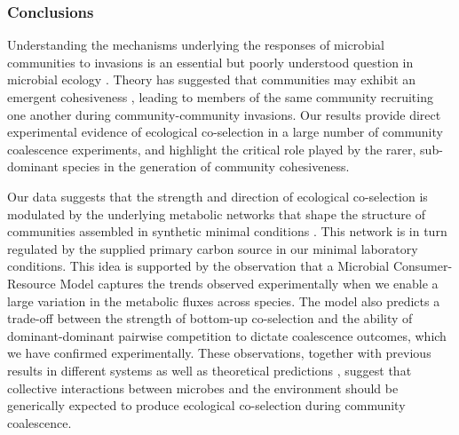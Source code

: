 \documentclass[a4paper,10pt]{article}
\begin{document}
\subsubsection*{Conclusions}

Understanding the mechanisms underlying the responses of microbial communities to invasions is
an essential but poorly understood question in microbial ecology \cite{Rillig2015}.
Theory has suggested that communities may exhibit an emergent cohesiveness
\cite{Gilpin1994,Livingston2013,Tikhonov2016,Tikhonov2017},
leading to members of the same community recruiting one another during
community-community invasions.
Our results provide direct experimental evidence of ecological co-selection in a large number
of community coalescence experiments,
and highlight the critical role played by the rarer, sub-dominant species in the generation
of community cohesiveness.

Our data suggests that the strength and direction of ecological co-selection is modulated
by the underlying metabolic networks that shape the structure of
communities assembled in synthetic minimal conditions
\cite{Goldford2018,Estrela2020}.
This network is in turn regulated by the supplied primary carbon source
in our minimal laboratory conditions.
This idea is supported by the observation that a Microbial Consumer-Resource Model
captures the trends observed experimentally when we enable a large variation
in the metabolic fluxes across species.
The model also predicts a trade-off between the strength of bottom-up co-selection
and the ability of dominant-dominant pairwise competition to dictate coalescence outcomes,
which we have confirmed experimentally.
These observations,
together with previous results in different systems \cite{Sierocinski2017} as well as
theoretical predictions
\cite{Gilpin1994,Toquenaga1997,Tikhonov2016,Tikhonov2017,Vila2019,Lechon2021},
suggest that collective interactions between microbes
and the environment should be generically expected to produce ecological co-selection
during community coalescence.
\end{document}

